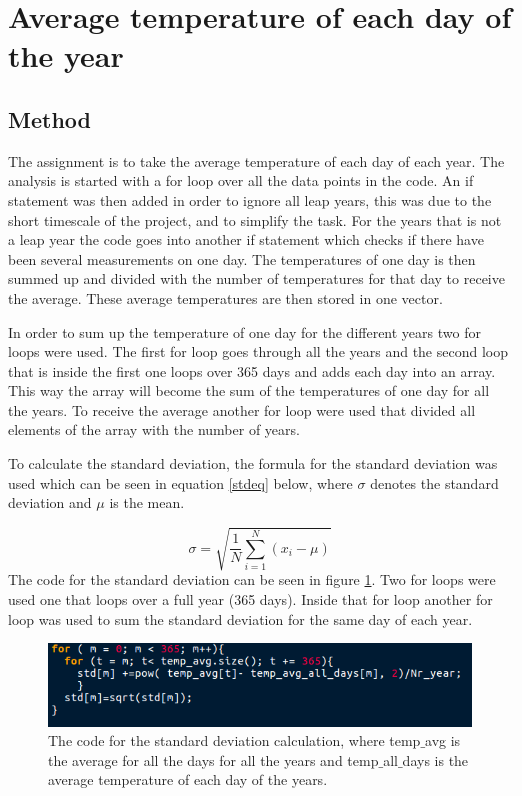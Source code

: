 \documentclass[12pt]{article}
\begin{document}
\section{Average temperature of each day of the year}
\subsection{Method}
The assignment is to take the average temperature of each day of each year. The analysis is started with a for loop over all the data points in the code. An if statement was then added in order to ignore all leap years, this was due to the short timescale of the project, and to simplify the task. For the years that is not a leap year the code goes into another if statement which checks if there have been several measurements on one day. The temperatures of one day is then summed up and divided with the number of temperatures for that day to receive the average. These average temperatures are then stored in one vector.

In order to sum up the temperature of one day for the different years two for loops were used. The first for loop goes through all the years and the second loop that is inside the first one loops over 365 days and adds each day into an array. This way the array will become the sum of the temperatures of one day for all the years. To receive the average another for loop were used that divided all elements of the array with the number of years.

To calculate the standard deviation, the formula for the standard deviation was used which can be seen in equation \ref{stdeq} below, where $\sigma$ denotes the standard deviation and $\mu$ is the mean.

\begin{equation}
\label{stdeq}
\sigma = \sqrt{\frac{1}{N} \sum ^N_{i=1} (x_i - \mu) }
\end{equation}
The code for the standard deviation can be seen in figure \ref{stdcode}. Two for loops were used one that loops over a full year (365 days). Inside that for loop another for loop was used to sum the standard deviation for the same day of each year.

\begin{figure}[H]
\includegraphics[scale= 0.5]{std_MNXB01.png}
\caption{The code for the standard deviation calculation, where temp$\_$avg is the average for all the days for all the years and temp$\_$all$\_$days is the average temperature of each day of the years. }
\label{stdcode}
\end{figure}
\end{document}
